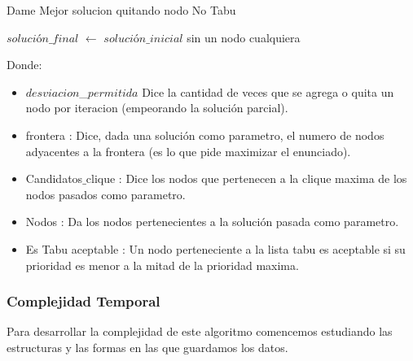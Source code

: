 \begin{algorithm}[H]
    \SetAlgoLined
    \caption{Dame Mejor solucion quitando nodo No Tabu}

	$solución\_final$ $\leftarrow$ $solución\_inicial$ sin un nodo cualquiera \\

\end{algorithm}

Donde:
\begin{itemize}
 \item $desviacion$\_$permitida$ Dice la cantidad de veces que se agrega o quita un nodo por iteracion (empeorando la solución parcial).
 \item frontera : Dice, dada una solución como parametro, el numero de nodos adyacentes a la frontera (es lo que pide maximizar el enunciado).
 \item Candidatos$\_$clique : Dice los nodos que pertenecen a la clique maxima de los nodos pasados como parametro.
 \item Nodos : Da los nodos pertenecientes a la solución pasada como parametro.
 \item Es Tabu aceptable : Un nodo perteneciente a la lista tabu es aceptable si su prioridad es menor a la mitad de la prioridad maxima.
\end{itemize}

\subsubsection{Complejidad Temporal}

 Para desarrollar la complejidad de este algoritmo comencemos estudiando las estructuras y las formas en las que guardamos los datos. \newline

